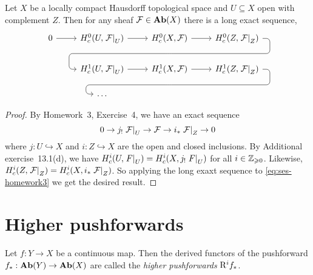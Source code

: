 \documentclass[../main.tex]{subfiles}
\begin{document}
\begin{lem}\label{lem:open-closed-sequence}
    Let $X$ be a locally compact Hausdorff topological space and $U\subseteq X$ open with complement $Z$. Then for any sheaf $\mathcal{F} \in \mathbf{Ab}(X)$ there is a long exact sequence,
    \[\begin{tikzcd}
            0 \ar[r] & H^0_c(U, \restr{\sh F}{U}) \ar[r] & H^0_c(X, \sh F) \ar[r] \ar[draw=none]{d}[name=X, anchor=center]{} & H^0_c(Z, \restr{\sh F}{Z})
            \ar[rounded corners,
            to path={ -- ([xshift=2ex]\tikztostart.east)
                      |- (X.center) \tikztonodes
                      -| ([xshift=-2ex]\tikztotarget.west)
                      -- (\tikztotarget)}]{dll}[at end]{} \\
            & H^1_c(U, \restr{\sh F}{U}) \ar[r] & H^1_c(X, \sh F) \ar[r] \ar[draw=none]{d}[name=Y, anchor=center]{} & H^1_c(Z, \restr{\sh F}{Z})
            \ar[rounded corners,
            to path={ -- ([xshift=2ex]\tikztostart.east)
                      |- (Y.center) \tikztonodes
                      -| ([xshift=-2ex]\tikztotarget.west)
                      -- (\tikztotarget)}]{dll}[at end]{} \\
            & \dots & {} & {}
    \end{tikzcd}\]
\end{lem}
\begin{proof}
    By Homework~3, Exercise~4, we have an exact sequence
    \begin{equation}\label{eq:ses-homework3}
        0 \to j_{!} \left.\mathcal{F}\right|_{U} \to \mathcal{F} \to i_*\left.\mathcal{F}\right|_{Z} \to 0
    \end{equation}
     where $j\colon U\hookrightarrow X$ and $i\colon Z\hookrightarrow X$ are the open and closed inclusions. By Additional exercise~13.1(d), we have
    $H^i_c(U, \left.F\right|_{U}) = H^i_c(X, j_{!}\left.F\right|_{U})$ for all $i\in \mathbb{Z}_{\geqslant 0}$. Likewise, $H^i_c(Z, \left.\mathcal{F}\right|_{Z}) = H^i_c(X, i_* \left.\mathcal{F}\right|_{Z})$. So applying the long exaxt sequence to \ref{eq:ses-homework3} we get the desired result.
\end{proof}


\section{Higher pushforwards}

\begin{defn}
    Let $f\colon Y \to X$ be a continuous map.
    Then the derived functors of the pushforward $f_*\colon \catAbelianGroup(Y) \to \catAbelianGroup(X)$ are called the \emph{higher pushforwards} $\mathrm{R}^i f_*$. 
\end{defn}
\end{document}
